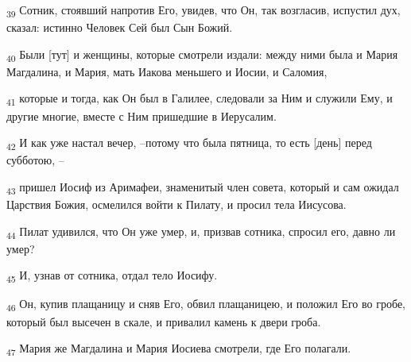 \begin{tcolorbox}
\textsubscript{39} Сотник, стоявший напротив Его, увидев, что Он, так возгласив, испустил дух, сказал: истинно Человек Сей был Сын Божий.
\end{tcolorbox}
\begin{tcolorbox}
\textsubscript{40} Были [тут] и женщины, которые смотрели издали: между ними была и Мария Магдалина, и Мария, мать Иакова меньшего и Иосии, и Саломия,
\end{tcolorbox}
\begin{tcolorbox}
\textsubscript{41} которые и тогда, как Он был в Галилее, следовали за Ним и служили Ему, и другие многие, вместе с Ним пришедшие в Иерусалим.
\end{tcolorbox}
\begin{tcolorbox}
\textsubscript{42} И как уже настал вечер, --потому что была пятница, то есть [день] перед субботою, --
\end{tcolorbox}
\begin{tcolorbox}
\textsubscript{43} пришел Иосиф из Аримафеи, знаменитый член совета, который и сам ожидал Царствия Божия, осмелился войти к Пилату, и просил тела Иисусова.
\end{tcolorbox}
\begin{tcolorbox}
\textsubscript{44} Пилат удивился, что Он уже умер, и, призвав сотника, спросил его, давно ли умер?
\end{tcolorbox}
\begin{tcolorbox}
\textsubscript{45} И, узнав от сотника, отдал тело Иосифу.
\end{tcolorbox}
\begin{tcolorbox}
\textsubscript{46} Он, купив плащаницу и сняв Его, обвил плащаницею, и положил Его во гробе, который был высечен в скале, и привалил камень к двери гроба.
\end{tcolorbox}
\begin{tcolorbox}
\textsubscript{47} Мария же Магдалина и Мария Иосиева смотрели, где Его полагали.
\end{tcolorbox}
